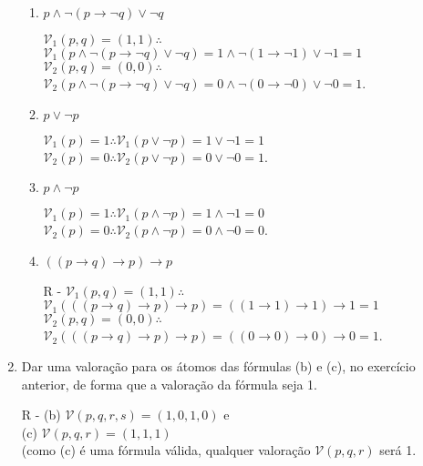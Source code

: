 \documentclass[12pt,a4paper,oneside]{article}
\begin{document}
\begin{enumerate}
\begin{enumerate}
			\item $p \wedge \neg (p \rightarrow \neg q) \vee \neg q$
			
			{\color{verde} $\mathcal{V}_1(p,q)=(1,1) \therefore$ \\
			$\mathcal{V}_1(p \wedge \neg (p \rightarrow \neg q) \vee \neg q) = 1 \wedge \neg (1 \rightarrow \neg 1) \vee \neg 1 = 1$ \\
			$\mathcal{V}_2(p,q)=(0,0) \therefore$ \\
			$\mathcal{V}_2(p \wedge \neg (p \rightarrow \neg q) \vee \neg q) = 0 \wedge \neg (0 \rightarrow \neg 0) \vee \neg 0 = 1$.}
			
			\item $p \vee \neg p$
			
			{\color{verde} $\mathcal{V}_1(p)= 1 \therefore \mathcal{V}_1(p \vee \neg p) = 1 \vee \neg 1 = 1$ \\
			$\mathcal{V}_2(p) = 0 \therefore \mathcal{V}_2(p \vee \neg p) = 0 \vee \neg 0 = 1$.}
			
			\item $p \wedge \neg p$
			
			{\color{verde} $\mathcal{V}_1(p)= 1 \therefore \mathcal{V}_1(p \wedge \neg p) = 1 \wedge \neg 1 = 0$ \\
			$\mathcal{V}_2(p) = 0 \therefore \mathcal{V}_2(p \wedge \neg p) = 0 \wedge \neg 0 = 0$.}			
			
			\item $((p \rightarrow q) \rightarrow p) \rightarrow p$
			
			{\color{verde} R - $\mathcal{V}_1(p,q)=(1,1) \therefore$ \\
			$\mathcal{V}_1(((p \rightarrow q) \rightarrow p) \rightarrow p) = ((1 \rightarrow 1) \rightarrow 1) \rightarrow 1 = 1$ \\
			$\mathcal{V}_2(p,q)=(0,0) \therefore$ \\
			$\mathcal{V}_2(((p \rightarrow q) \rightarrow p) \rightarrow p) = ((0 \rightarrow 0) \rightarrow 0) \rightarrow 0 = 1$.}
			
		\end{enumerate}
	
	\item Dar uma valoração para os átomos das fórmulas (b) e (c), no exercício anterior, de forma que a valoração da fórmula seja 1.
	
	{\color{verde} R - (b) $\mathcal{V}(p,q,r,s)=(1,0,1,0)$ e \\(c) $\mathcal{V}(p,q,r)=(1,1,1)$ \\(como (c) é uma fórmula válida, qualquer valoração $\mathcal{V}(p,q,r)$ será 1.}
		

\end{enumerate}
\end{document}
